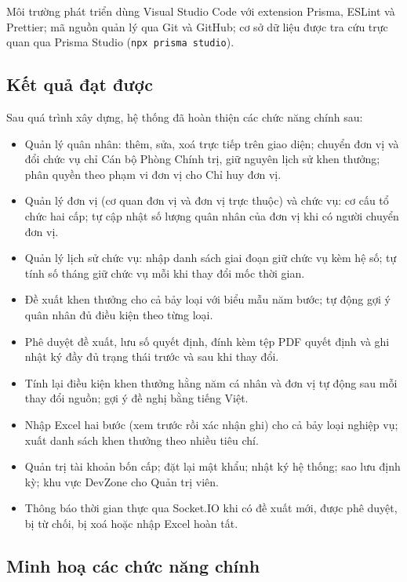 \documentclass[../DoAn.tex]{subfiles}
\begin{document}
Môi trường phát triển dùng Visual Studio Code với extension Prisma, ESLint và Prettier; mã nguồn quản lý qua Git và GitHub; cơ sở dữ liệu được tra cứu trực quan qua Prisma Studio (\texttt{npx prisma studio}).

\subsection{Kết quả đạt được}
\label{subsection:4.3.2}

Sau quá trình xây dựng, hệ thống đã hoàn thiện các chức năng chính sau:

\begin{itemize}
    \item Quản lý quân nhân: thêm, sửa, xoá trực tiếp trên giao diện; chuyển đơn vị và đổi chức vụ chỉ Cán bộ Phòng Chính trị, giữ nguyên lịch sử khen thưởng; phân quyền theo phạm vi đơn vị cho Chỉ huy đơn vị.
    \item Quản lý đơn vị (cơ quan đơn vị và đơn vị trực thuộc) và chức vụ: cơ cấu tổ chức hai cấp; tự cập nhật số lượng quân nhân của đơn vị khi có người chuyển đơn vị.
    \item Quản lý lịch sử chức vụ: nhập danh sách giai đoạn giữ chức vụ kèm hệ số; tự tính số tháng giữ chức vụ mỗi khi thay đổi mốc thời gian.
    \item Đề xuất khen thưởng cho cả bảy loại với biểu mẫu năm bước; tự động gợi ý quân nhân đủ điều kiện theo từng loại.
    \item Phê duyệt đề xuất, lưu số quyết định, đính kèm tệp PDF quyết định và ghi nhật ký đầy đủ trạng thái trước và sau khi thay đổi.
    \item Tính lại điều kiện khen thưởng hằng năm cá nhân và đơn vị tự động sau mỗi thay đổi nguồn; gợi ý đề nghị bằng tiếng Việt.
    \item Nhập Excel hai bước (xem trước rồi xác nhận ghi) cho cả bảy loại nghiệp vụ; xuất danh sách khen thưởng theo nhiều tiêu chí.
    \item Quản trị tài khoản bốn cấp; đặt lại mật khẩu; nhật ký hệ thống; sao lưu định kỳ; khu vực DevZone cho Quản trị viên.
    \item Thông báo thời gian thực qua Socket.IO khi có đề xuất mới, được phê duyệt, bị từ chối, bị xoá hoặc nhập Excel hoàn tất.
\end{itemize}

\subsection{Minh hoạ các chức năng chính}
\label{subsection:4.3.3}
\end{document}

